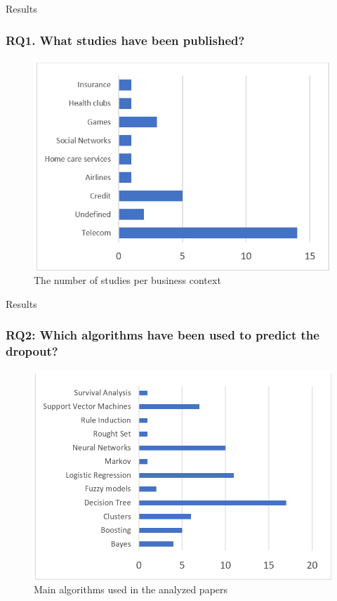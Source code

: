 \documentclass[10pt]{beamer}
\begin{document}
\begin{frame}[fragile]{Results}
	\frametitle{RQ1. What studies have been published?}
	\begin{figure}
		\includegraphics[scale=0.5]{../img/studiesByBusiness.png}
		\caption{The number of studies per business context}
		\label{figure3}
	\end{figure}
\end{frame}

\begin{frame}[fragile]{Results}
	\frametitle{RQ2: Which algorithms have been used to predict the dropout?}
	\begin{figure}
		\includegraphics[scale=0.5]{../img/mainAlgorithms.png}
		\caption{Main algorithms used in the analyzed papers}
		\label{figure3}
	\end{figure}
\end{frame}
\end{document}
